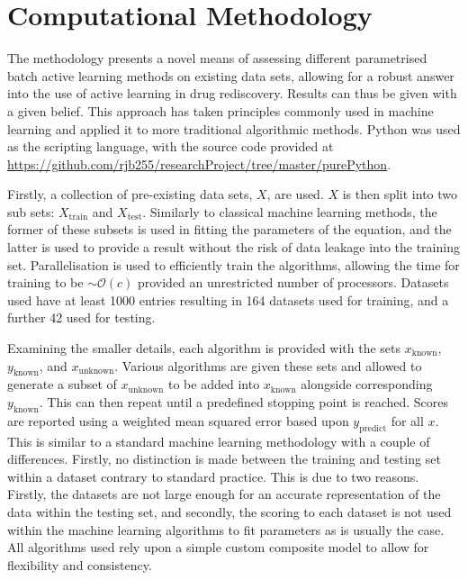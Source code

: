 
\section{Computational Methodology}
The methodology presents a novel means of assessing different parametrised batch active learning methods on existing data sets, allowing for a robust answer into the use of active learning in drug rediscovery. Results can thus be given with a given belief. This approach has taken principles commonly used in machine learning and applied it to more traditional algorithmic methods. Python was used as the scripting language, with the source code provided at \url{https://github.com/rjb255/researchProject/tree/master/purePython}.

Firstly, a collection of pre-existing data sets, $X$, are used. $X$ is then split into two sub sets: $X_{\mathrm{train}}$ and $X_\mathrm{test}$. Similarly to classical machine learning methods, the former of these subsets is used in fitting the parameters of the equation, and the latter is used to provide a result without the risk of data leakage into the training set. Parallelisation is used to efficiently train the algorithms, allowing the time for training to be $\sim{}\mathcal{O}(c)$ provided an unrestricted number of processors. Datasets used have at least 1000 entries resulting in 164 datasets used for training, and a further 42 used for testing.

Examining the smaller details, each algorithm is provided with the sets $x_\mathrm{known}$, $y_\mathrm{known}$, and $x_\mathrm{unknown}$. Various algorithms are given these sets and allowed to generate a subset of $x_\mathrm{unknown}$ to be added into $x_\mathrm{known}$ alongside corresponding $y_\mathrm{known}$. This can then repeat until a predefined stopping point is reached. Scores are reported using a weighted mean squared error based upon $y_\mathrm{predict}$ for all $x$. This is similar to a standard machine learning methodology with a couple of differences. Firstly, no distinction is made between the training and testing set within a dataset contrary to standard practice. This is due to two reasons. Firstly, the datasets are not large enough for an accurate representation of the data within the testing set, and secondly, the scoring to each dataset is not used within the machine learning algorithms to fit parameters as is usually the case. All algorithms used rely upon a simple custom composite model to allow for flexibility and consistency.


